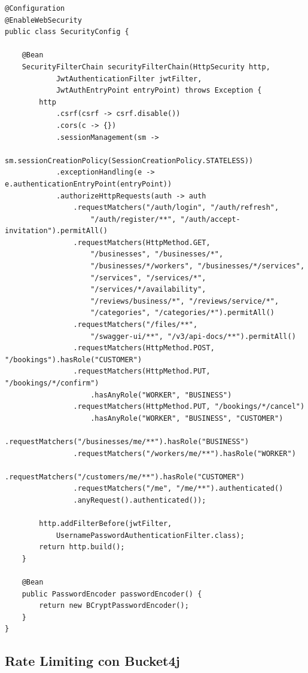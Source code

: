 \documentclass[12pt,a4paper,twoside]{report}
\begin{document}
\begin{lstlisting}[style=javaStyle, caption={Configuración de Spring Security (SecurityConfig.java)}, label={lst:security}]
@Configuration
@EnableWebSecurity
public class SecurityConfig {

    @Bean
    SecurityFilterChain securityFilterChain(HttpSecurity http,
            JwtAuthenticationFilter jwtFilter,
            JwtAuthEntryPoint entryPoint) throws Exception {
        http
            .csrf(csrf -> csrf.disable())
            .cors(c -> {})
            .sessionManagement(sm ->
                sm.sessionCreationPolicy(SessionCreationPolicy.STATELESS))
            .exceptionHandling(e -> e.authenticationEntryPoint(entryPoint))
            .authorizeHttpRequests(auth -> auth
                .requestMatchers("/auth/login", "/auth/refresh",
                    "/auth/register/**", "/auth/accept-invitation").permitAll()
                .requestMatchers(HttpMethod.GET,
                    "/businesses", "/businesses/*",
                    "/businesses/*/workers", "/businesses/*/services",
                    "/services", "/services/*",
                    "/services/*/availability",
                    "/reviews/business/*", "/reviews/service/*",
                    "/categories", "/categories/*").permitAll()
                .requestMatchers("/files/**",
                    "/swagger-ui/**", "/v3/api-docs/**").permitAll()
                .requestMatchers(HttpMethod.POST, "/bookings").hasRole("CUSTOMER")
                .requestMatchers(HttpMethod.PUT, "/bookings/*/confirm")
                    .hasAnyRole("WORKER", "BUSINESS")
                .requestMatchers(HttpMethod.PUT, "/bookings/*/cancel")
                    .hasAnyRole("WORKER", "BUSINESS", "CUSTOMER")
                .requestMatchers("/businesses/me/**").hasRole("BUSINESS")
                .requestMatchers("/workers/me/**").hasRole("WORKER")
                .requestMatchers("/customers/me/**").hasRole("CUSTOMER")
                .requestMatchers("/me", "/me/**").authenticated()
                .anyRequest().authenticated());

        http.addFilterBefore(jwtFilter,
            UsernamePasswordAuthenticationFilter.class);
        return http.build();
    }

    @Bean
    public PasswordEncoder passwordEncoder() {
        return new BCryptPasswordEncoder();
    }
}
\end{lstlisting}

\subsection{Rate Limiting con Bucket4j}
\end{document}
